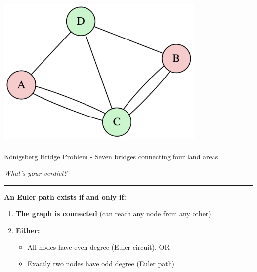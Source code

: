 \documentclass[
  letterpaper,
  DIV=11,
  numbers=noendperiod,
  oneside]{scrartcl}
\providecommand{\tightlist}{%
  \setlength{\itemsep}{0pt}\setlength{\parskip}{0pt}}
\begin{document}
\includegraphics[width=4in,height=3in]{slide01_files/figure-latex/dot-figure-7.png}

Königsberg Bridge Problem - Seven bridges connecting four land areas

\emph{What's your verdict?}

\begin{center}\rule{0.5\linewidth}{0.5pt}\end{center}

\begin{tcolorbox}[enhanced jigsaw, opacityback=0, bottomtitle=1mm, toptitle=1mm, breakable, rightrule=.15mm, colbacktitle=quarto-callout-tip-color!10!white, toprule=.15mm, coltitle=black, colback=white, titlerule=0mm, opacitybacktitle=0.6, title=\textcolor{quarto-callout-tip-color}{\faLightbulb}\hspace{0.5em}{Euler Path Theorem}, arc=.35mm, leftrule=.75mm, bottomrule=.15mm, left=2mm, colframe=quarto-callout-tip-color-frame]

\textbf{An Euler path exists if and only if:}

\begin{enumerate}
\def\labelenumi{\arabic{enumi}.}
\tightlist
\item
  \textbf{The graph is connected} (can reach any node from any other)
\item
  \textbf{Either:}

  \begin{itemize}
  \tightlist
  \item
    All nodes have even degree (Euler circuit), OR
  \item
    Exactly two nodes have odd degree (Euler path)
  \end{itemize}
\end{enumerate}

\end{tcolorbox}
\end{document}
